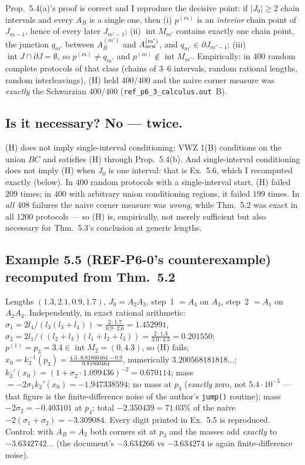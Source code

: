 \documentclass[11pt]{article}
\theoremstyle{definition}\newtheorem{example}[theorem]{Example}
\begin{document}
Prop.~5.4(a)'s proof is correct and I reproduce the decisive point: if $|J_0|\ge2$ chain
intervals and every $A_B$ is a single one, then (i) $p^{(m)}$ is an \emph{interior} chain
point of $J_{m-1}$, hence of every later $J_{m'-1}$; (ii)
$\operatorname{int}M_{m'}$ contains exactly one chain point, the junction $q_{m'}$ between
$A^{(m')}_B$ and $A^{(m')}_{\rm new}$, and $q_{m'}\in\partial J_{m'-1}$; (iii)
$\operatorname{int}J\cap\partial J=\emptyset$, so $p^{(m)}\ne q_{m'}$ and
$p^{(m)}\notin\operatorname{int}M_{m'}$.  Empirically: in $400$ random complete protocols
of that class (chains of $3$--$6$ intervals, random rational lengths, random interleavings),
(H) held $400/400$ and the naive corner measure was \emph{exactly} the Schwarzian
$400/400$ (\texttt{ref\_p6\_3\_calculus.out}~B).

\subsection{Is it necessary?  No --- twice.}

(H) does not imply single-interval conditioning: VWZ 1(B) conditions on the union $BC$ and
satisfies (H) through Prop.~5.4(b).  And single-interval conditioning does not imply (H)
when $J_0$ is one interval: that is Ex.~5.6, which I recomputed exactly (below).  In $400$
random protocols with a single-interval start, (H) failed $209$ times; in $400$ with
arbitrary union conditioning regions, it failed $199$ times.  In \emph{all $408$} failures
the naive corner measure was \emph{wrong}, while Thm.~5.2 was exact in all $1200$
protocols --- so (H) is, empirically, not merely sufficient but also necessary for
Thm.~5.3's conclusion at generic lengths.

\subsection{Example 5.5 (REF-P6-0's counterexample) recomputed from Thm.~5.2}

Lengths $(1.3,2.1,0.9,1.7)$, $J_0=A_2A_3$, step~1 $=A_4$ on $A_3$, step~2 $=A_1$ on
$A_2A_3$.  Independently, in exact rational arithmetic:
$\sigma_1=2l_4/(l_3(l_3+l_4))=\frac{2\cdot1.7}{0.9\cdot2.6}=1.452991$,
$\sigma_2=2l_1/((l_2+l_3)(l_1+l_2+l_3))=\frac{2\cdot1.3}{3.0\cdot4.3}=0.201550$;
$p^{(1)}=p_3=3.4\in\operatorname{int}M_2=(0,4.3)$, so (H) fails;
$x_0=k_2^{-1}(p_3)=\tfrac{4.3\cdot0.81860464-0.9}{0.81860464}$, numerically
$3.200568181818\ldots$; $k_2'(x_0)=(1+\sigma_2\cdot1.099436)^{-2}=0.670114$;
mass $=-2\sigma_1k_2'(x_0)=-1.947338594$; no mass at $p_3$ (\emph{exactly} zero, not
$5.4\cdot10^{-5}$ --- that figure is the finite-difference noise of the author's
\texttt{jump()} routine); mass $-2\sigma_2=-0.403101$ at $p_4$; total
$-2.350439=71.03\%$ of the naive $-2(\sigma_1+\sigma_2)=-3.309084$.  Every digit printed
in Ex.~5.5 is reproduced.  Control: with $A_B=A_2$ both corners sit at $p_3$ and the
masses add \emph{exactly} to $-3.6342742\ldots$ (the document's $-3.634266$ vs
$-3.634274$ is again finite-difference noise).
\end{document}
